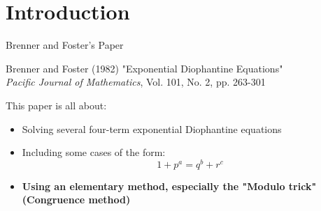 \section{Introduction}

\begin{frame}{Brenner and Foster's Paper}
        \begin{block}{Brenner and Foster (1982)}
            "Exponential Diophantine Equations" \\
            \textit{Pacific Journal of Mathematics}, Vol. 101, No. 2, pp. 263-301
        \end{block}
        This paper is all about:
        \begin{itemize}
            \item Solving several four-term exponential Diophantine equations
            \item  Including some cases of the form:
            \begin{equation}
                \label{main}
                1+p^a = q^b + r^c
            \end{equation}
            \item \textbf{Using an elementary method, especially the "Modulo trick" (Congruence method)}
        \end{itemize}
\end{frame}

